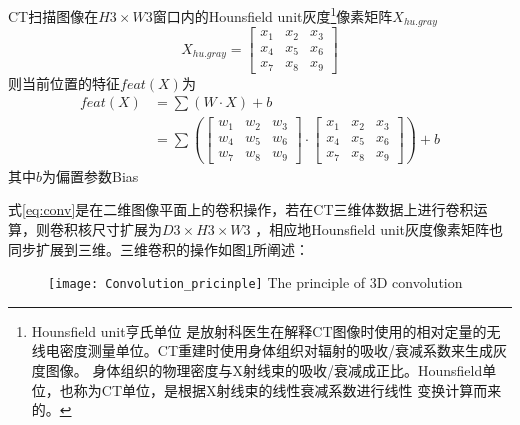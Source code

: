CT扫描图像在$H3 \times W3$窗口内的Hounsfield unit\cite{HU2016CT}灰度\footnote{Hounsfield unit亨氏单位
是放射科医生在解释CT图像时使用的相对定量的无线电密度测量单位。CT重建时使用身体组织对辐射的吸收/衰减系数来生成灰度图像。
身体组织的物理密度与X射线束的吸收/衰减成正比。Hounsfield单位，也称为CT单位，是根据X射线束的线性衰减系数进行线性
变换计算而来的。}像素矩阵$X_{hu.gray}$
\begin{equation}
    X_{hu.gray} = \begin{bmatrix}
        x_1 & x_2 & x_3 \\
        x_4 & x_5 & x_6 \\
        x_7 & x_8 & x_9
    \end{bmatrix}
\end{equation}
则当前位置的特征$feat(X)$为
\begin{equation}\label{eq:conv}
\begin{split}
    {feat}(X) &= \sum{\left(W \cdot X\right)} + b \\
            &= \sum{\left(\begin{bmatrix}
                        w_1 & w_2 & w_3 \\
                        w_4 & w_5 & w_6 \\
                        w_7 & w_8 & w_9
                    \end{bmatrix} \cdot 
                    \begin{bmatrix}
                        x_1 & x_2 & x_3 \\
                        x_4 & x_5 & x_6 \\
                        x_7 & x_8 & x_9
                    \end{bmatrix}\right)} + b
\end{split}
\end{equation}
其中$b$为偏置参数Bias

式\ref{eq:conv}是在二维图像平面上的卷积操作，若在CT三维体数据上进行卷积运算，则卷积核尺寸扩展为$D3 \times H3 \times W3$
，相应地Hounsfield unit灰度像素矩阵也同步扩展到三维。三维卷积的操作如图\ref{fig:3D_Conv}所阐述：
\begin{figure}[!htp]
    \centering
    \texttt{[image: Convolution\_pricinple]}
        {The principle of 3D convolution}
    \label{fig:3D_Conv}
\end{figure}

